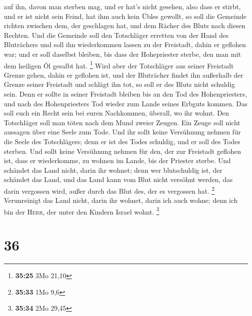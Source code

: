 auf ihn, davon man sterben mag, und er hat's nicht gesehen, also dass er
stirbt, und er ist nicht sein Feind, hat ihm auch kein Übles gewollt,
 so soll die Gemeinde richten zwischen dem, der
geschlagen hat, und dem Rächer des Bluts nach diesen Rechten.
 Und die Gemeinde soll den Totschläger erretten von der
Hand des Bluträchers und soll ihn wiederkommen lassen zu der Freistadt,
dahin er geflohen war; und er soll daselbst bleiben, bis dass der
Hohepriester sterbe, den man mit dem heiligen Öl gesalbt hat.
\footnote{\textbf{35:25} 3Mo 21,10}  Wird aber der
Totschläger aus seiner Freistadt Grenze gehen, dahin er geflohen ist,
 und der Bluträcher findet ihn außerhalb der Grenze
seiner Freistadt und schlägt ihn tot, so soll er des Bluts nicht
schuldig sein.  Denn er sollte in seiner Freistadt
bleiben bis an den Tod des Hohenpriesters, und nach des Hohenpriesters
Tod wieder zum Lande seines Erbguts kommen.  Das soll
euch ein Recht sein bei euren Nachkommen, überall, wo ihr wohnt.
 Den Totschläger soll man töten nach dem Mund zweier
Zeugen. Ein Zeuge soll nicht aussagen über eine Seele zum Tode.
 Und ihr sollt keine Versühnung nehmen für die Seele des
Totschlägers; denn er ist des Todes schuldig, und er soll des Todes
sterben.  Und sollt keine Versühnung nehmen für den, der
zur Freistadt geflohen ist, dass er wiederkomme, zu wohnen im Lande, bis
der Priester sterbe.  Und schändet das Land nicht, darin
ihr wohnet; denn wer blutschuldig ist, der schändet das Land, und das
Land kann vom Blut nicht versöhnt werden, das darin vergossen wird,
außer durch das Blut des, der es vergossen hat. \footnote{\textbf{35:33}
  1Mo 9,6}  Verunreinigt das Land nicht, darin ihr
wohnet, darin ich auch wohne; denn ich bin der \textsc{Herr}, der unter
den Kindern Israel wohnt. \footnote{\textbf{35:34} 2Mo 29,45}

\hypertarget{section-6}{%
\section{36}\label{section-6}}

